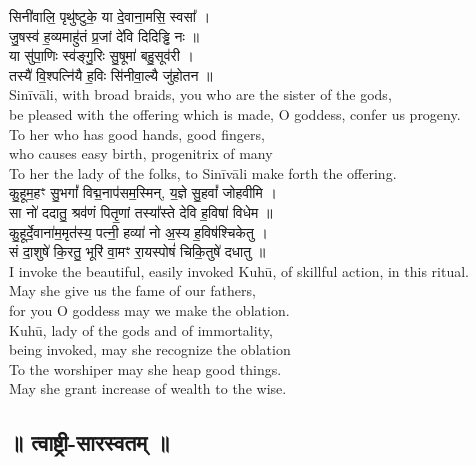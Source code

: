 \documentclass[11pt]{article}
\begin{document}
\begin{adjustwidth}{6em}{.2em}
{\large\skts\color{deepblue}
सिनी॑वालि॒ पृथु॑ष्टुके॒ या दे॒वाना॒मसि॒ स्वसा᳚ ।\\
जु॒षस्व॑ ह॒व्यमाहु॑तं प्र॒जां दे॑वि दिदिड्ढि नः ॥\\
या सु॑पा॒णिः स्व॑ङ्गु॒रिः सु॒षूमा॑ बहु॒सूव॑री ।\\
तस्यै॑ वि॒श्पत्नि॑यै ह॒विः सि॑नीवा॒ल्यै जु॑होतन ॥}\\[5pt]
Sinīvāli, with broad braids, you who are the sister of the gods,\\
be pleased with the offering which is made, O goddess, confer us progeny.\\
To her who has good hands, good fingers,\\ 
who causes easy birth, progenitrix of many\\
To her the lady of the folks, to Sinīvāli make forth the offering.\\[10pt]

{\large\skts\color{deepblue}
कु॒हूम॒हꣳ सु॒भगां᳚ विद्म॒नाप॑सम॒स्मिन्, य॒ज्ञे सु॒हवां᳚ जोहवीमि ।\\
सा नो॑ ददातु॒ श्रव॑णं पितृ॒णां तस्या᳚स्ते देवि ह॒विषा॑ विधेम ॥\\
कु॒हूर्दे॒वाना॑म॒मृत॑स्य॒ पत्नी॒ हव्या॑ नो अ॒स्य ह॒विष॑श्चिकेतु ।\\
सं दा॒शुषे॑ कि॒रतु॒ भूरि॑ वा॒मꣳ रा॒यस्पोषं॑ चिकि॒तुषे॑ दधातु ॥}\\[5pt]
I invoke the beautiful, easily invoked Kuhū, of skillful action, in this ritual.\\
May she give us the fame of our fathers,\\
for you O goddess may we make the oblation.\\
Kuhū, lady of the gods and of immortality,\\
being invoked, may she recognize the oblation\\
To the worshiper may she heap good things.\\
May she grant increase of wealth to the wise.\\
\end{adjustwidth}
\newpage
\begin{center}
	\section{{\Large\skts ॥ त्वाष्ट्री-सारस्वतम् ॥}}
\end{center}
\end{document}
